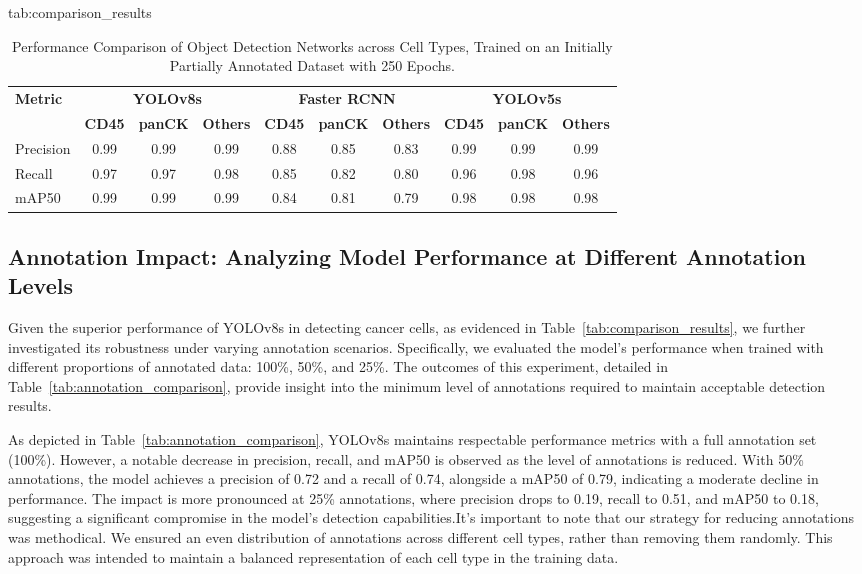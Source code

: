 \documentclass[anon]{midl} %
\begin{document}
\begin{table}[htbp]
\floatconts
  {tab:comparison_results}%
{\caption{Performance Comparison of Object Detection Networks across Cell Types, Trained on an Initially Partially Annotated Dataset with 250 Epochs.}}%
  {\begin{tabular}{l|ccc|ccc|ccc}
  \bfseries Metric & \multicolumn{3}{c|}{\bfseries YOLOv8s} & \multicolumn{3}{c|}{\bfseries Faster RCNN} & \multicolumn{3}{c}{\bfseries YOLOv5s}\\
  & {\small \bfseries CD45} & {\small \bfseries panCK} & {\small \bfseries Others} & {\small \bfseries CD45} & {\small \bfseries panCK} & {\small \bfseries Others} & {\small \bfseries CD45} & {\small \bfseries panCK} & {\small \bfseries Others}\\
  Precision & 0.99 & 0.99 & 0.99 & 0.88 & 0.85 & 0.83 & 0.99 & 0.99 & 0.99\\
  Recall & 0.97 & 0.97 & 0.98 & 0.85 & 0.82 & 0.80 & 0.96 & 0.98 & 0.96\\
  mAP50 & 0.99 & 0.99 & 0.99 & 0.84 & 0.81 & 0.79 & 0.98 & 0.98 & 0.98
  \end{tabular}}
\end{table}

\subsection{Annotation Impact: Analyzing Model Performance at Different Annotation Levels}
Given the superior performance of YOLOv8s in detecting cancer cells, as evidenced in Table~\ref{tab:comparison_results}, we further investigated its robustness under varying annotation scenarios. Specifically, we evaluated the model's performance when trained with different proportions of annotated data: 100\%, 50\%, and 25\%. The outcomes of this experiment, detailed in Table~\ref{tab:annotation_comparison}, provide insight into the minimum level of annotations required to maintain acceptable detection results.

As depicted in Table~\ref{tab:annotation_comparison}, YOLOv8s maintains respectable performance metrics with a full annotation set (100\%). However, a notable decrease in precision, recall, and mAP50 is observed as the level of annotations is reduced. With 50\% annotations, the model achieves a precision of 0.72 and a recall of 0.74, alongside a mAP50 of 0.79, indicating a moderate decline in performance. The impact is more pronounced at 25\% annotations, where precision drops to 0.19, recall to 0.51, and mAP50 to 0.18, suggesting a significant compromise in the model's detection capabilities.It's important to note that our strategy for reducing annotations was methodical. We ensured an even distribution of annotations across different cell types, rather than removing them randomly. This approach was intended to maintain a balanced representation of each cell type in the training data.
\end{document}
